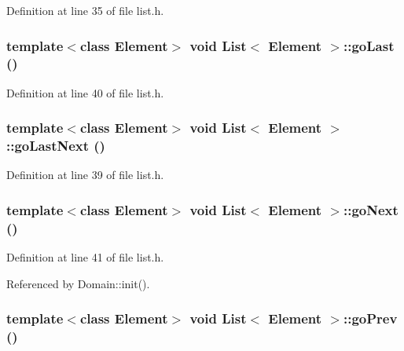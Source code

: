Definition at line 35 of file list.h.\hypertarget{classList_8c492b1f7cbd39c780785a4e9720f9f7}{
\subsubsection[{goLast}]{\setlength{\rightskip}{0pt plus 5cm}template$<$class Element$>$ void {\bf List}$<$ Element $>$::goLast ()}}
\label{classList_8c492b1f7cbd39c780785a4e9720f9f7}




Definition at line 40 of file list.h.\hypertarget{classList_60201d0166b5481b1eb178d3b4f5c5ef}{
\subsubsection[{goLastNext}]{\setlength{\rightskip}{0pt plus 5cm}template$<$class Element$>$ void {\bf List}$<$ Element $>$::goLastNext ()}}
\label{classList_60201d0166b5481b1eb178d3b4f5c5ef}




Definition at line 39 of file list.h.\hypertarget{classList_1bec5a68e53c10d76d5286d19c1b52e0}{
\subsubsection[{goNext}]{\setlength{\rightskip}{0pt plus 5cm}template$<$class Element$>$ void {\bf List}$<$ Element $>$::goNext ()}}
\label{classList_1bec5a68e53c10d76d5286d19c1b52e0}




Definition at line 41 of file list.h.

Referenced by Domain::init().\hypertarget{classList_655c3217de571cbb357c20285692e86d}{
\subsubsection[{goPrev}]{\setlength{\rightskip}{0pt plus 5cm}template$<$class Element$>$ void {\bf List}$<$ Element $>$::goPrev ()}}
\label{classList_655c3217de571cbb357c20285692e86d}




